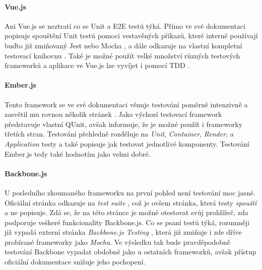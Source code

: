 \paragraph{Vue.js} Ani Vue.js se neztratí co se Unit a E2E testů týká. Přímo ve své dokumentaci \cite{vue-test} popisuje spouštění Unit testů pomoci vestavěných příkazů, které interně používají buďto již zmiňovaný Jest nebo Mocha \cite{mocha}, a dále odkazuje na vlastní kompletní testovací knihovnu \cite{vue-test-utils}. Také je možné použít velké množství různých testových frameworků a aplikace ve Vue.js lze vyvíjet i pomocí TDD \cite{vue-tdd}.

\paragraph{Ember.js} Tento framework se ve své dokumentaci věnuje testování poměrně intenzivně a zasvětil mu rovnou několik stránek \cite{ember-test}. Jako výchozí testovací framework představuje vlastní QUnit, avšak informuje, že je možné použít i frameworky třetích stran. Testování přehledně rozděluje na \emph{Unit}, \emph{Container}, \emph{Render}, a \emph{Application} testy a také popisuje jak testovat jednotlivé komponenty. Testování Ember.js tedy také hodnotím jako velmi dobré.

\paragraph{Backbone.js} U posledního zkoumaného frameworku na první pohled není testování moc jasné. Oficiální stránka odkazuje na \emph{test suite} \cite{backbone-test}, což je ovšem stránka, která testy \emph{spouští} a ne popisuje. Zdá se, že na této stránce je možné otestovat svůj prohlížeč, zda podporuje veškeré funkcionality Backbone.js. Co se psaní testů týká, rozumněji již vypadá externí stránka \emph{Backbone.js Testing} \cite{backbone-testing}, která již zmiňuje i zde dříve probírané frameworky jako \emph{Mocha}. Ve výsledku tak bude pravděpodobně testování Backbone vypadat obdobně jako u ostatních frameworků, avšak přístup oficiální dokumentace snižuje jeho pochopení.

